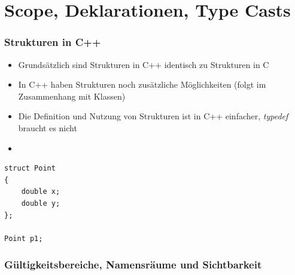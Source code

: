 
\part{Scope, Deklarationen, Type Casts}

\section{Strukturen in C++}
\label{sec:strukturen}
\begin{minipage}{0.75\linewidth}
\begin{itemize}
	\item Grundsätzlich sind Strukturen in C++ identisch zu Strukturen in C
	\item In C++ haben Strukturen noch zusätzliche Möglichkeiten (folgt im Zusammenhang mit Klassen)
	\item Die Definition und Nutzung von Strukturen ist in C++ einfacher, \emph{typedef} braucht es nicht
	\item[\-]
\end{itemize}
\end{minipage}%
\hspace{0.05\linewidth}
\begin{minipage}{0.15\linewidth}
\begin{lstlisting}
struct Point
{
	double x;
	double y;
};
	
Point p1;
\end{lstlisting}
\end{minipage}

\section{Gültigkeitsbereiche, Namensräume und Sichtbarkeit}

